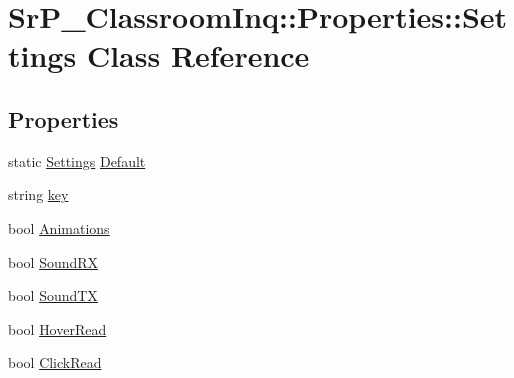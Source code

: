 \hypertarget{class_sr_p___classroom_inq_1_1_properties_1_1_settings}{
\section{\-Sr\-P\-\_\-\-Classroom\-Inq\-:\-:\-Properties\-:\-:\-Settings \-Class \-Reference}
\label{class_sr_p___classroom_inq_1_1_properties_1_1_settings}
}
\subsection*{\-Properties}
\begin{DoxyCompactItemize}
\item 
static \hyperlink{class_sr_p___classroom_inq_1_1_properties_1_1_settings}{\-Settings} \hyperlink{class_sr_p___classroom_inq_1_1_properties_1_1_settings_a5c8b0314d6aca6beb6e0cfbc82fd3754}{\-Default}
\item 
string \hyperlink{class_sr_p___classroom_inq_1_1_properties_1_1_settings_adcf8c99db5c2978cebd00b77880dc4f9}{key}
\item 
bool \hyperlink{class_sr_p___classroom_inq_1_1_properties_1_1_settings_ab4e4d47d4289ea293aa6c3176ef7ba39}{\-Animations}
\item 
bool \hyperlink{class_sr_p___classroom_inq_1_1_properties_1_1_settings_ab0ec9af30232e0f23083548e3b7242a2}{\-Sound\-R\-X}
\item 
bool \hyperlink{class_sr_p___classroom_inq_1_1_properties_1_1_settings_a0baa5402bcfc0c013d2c43fd95adc7e2}{\-Sound\-T\-X}
\item 
bool \hyperlink{class_sr_p___classroom_inq_1_1_properties_1_1_settings_a9e2211fd7a7199dbfaa600115f7a2184}{\-Hover\-Read}
\item 
bool \hyperlink{class_sr_p___classroom_inq_1_1_properties_1_1_settings_af45458c33afb096610d416c61ac86e16}{\-Click\-Read}

\end{DoxyCompactItemize}
